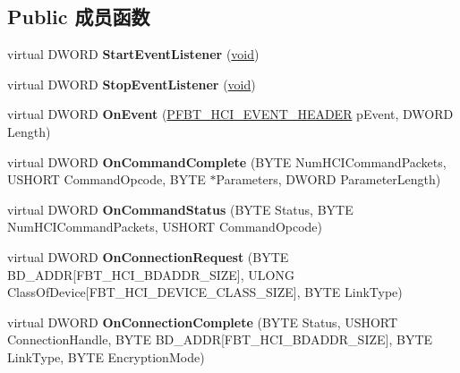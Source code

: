 \subsection*{Public 成员函数}
\begin{DoxyCompactItemize}
\item 
\mbox{\label{class_c_hci_afe226701fc5e2f46b43d4fa34168ecdd}} 
virtual D\+W\+O\+RD {\bfseries Start\+Event\+Listener} (\hyperlink{interfacevoid}{void})
\item 
\mbox{\label{class_c_hci_a0b99c2da2ab8553edd461967981700bb}} 
virtual D\+W\+O\+RD {\bfseries Stop\+Event\+Listener} (\hyperlink{interfacevoid}{void})
\item 
\mbox{\label{class_c_hci_a75c4ca0dd2c7b222f7442509fc59a24c}} 
virtual D\+W\+O\+RD {\bfseries On\+Event} (\hyperlink{struct_f_b_t___h_c_i___e_v_e_n_t___h_e_a_d_e_r}{P\+F\+B\+T\+\_\+\+H\+C\+I\+\_\+\+E\+V\+E\+N\+T\+\_\+\+H\+E\+A\+D\+ER} p\+Event, D\+W\+O\+RD Length)
\item 
\mbox{\label{class_c_hci_aa09bf4fd9dfb3e8ec46a78266e295d37}} 
virtual D\+W\+O\+RD {\bfseries On\+Command\+Complete} (B\+Y\+TE Num\+H\+C\+I\+Command\+Packets, U\+S\+H\+O\+RT Command\+Opcode, B\+Y\+TE $\ast$Parameters, D\+W\+O\+RD Parameter\+Length)
\item 
\mbox{\label{class_c_hci_a4613960747fbb538be3a776213e8fe70}} 
virtual D\+W\+O\+RD {\bfseries On\+Command\+Status} (B\+Y\+TE Status, B\+Y\+TE Num\+H\+C\+I\+Command\+Packets, U\+S\+H\+O\+RT Command\+Opcode)
\item 
\mbox{\label{class_c_hci_af60aa66b4510d8d9acc399848601fb38}} 
virtual D\+W\+O\+RD {\bfseries On\+Connection\+Request} (B\+Y\+TE B\+D\+\_\+\+A\+D\+DR\mbox{[}F\+B\+T\+\_\+\+H\+C\+I\+\_\+\+B\+D\+A\+D\+D\+R\+\_\+\+S\+I\+ZE\mbox{]}, U\+L\+O\+NG Class\+Of\+Device\mbox{[}F\+B\+T\+\_\+\+H\+C\+I\+\_\+\+D\+E\+V\+I\+C\+E\+\_\+\+C\+L\+A\+S\+S\+\_\+\+S\+I\+ZE\mbox{]}, B\+Y\+TE Link\+Type)
\item 
\mbox{\label{class_c_hci_a3260c73f6f766862a29a719677784b43}} 
virtual D\+W\+O\+RD {\bfseries On\+Connection\+Complete} (B\+Y\+TE Status, U\+S\+H\+O\+RT Connection\+Handle, B\+Y\+TE B\+D\+\_\+\+A\+D\+DR\mbox{[}F\+B\+T\+\_\+\+H\+C\+I\+\_\+\+B\+D\+A\+D\+D\+R\+\_\+\+S\+I\+ZE\mbox{]}, B\+Y\+TE Link\+Type, B\+Y\+TE Encryption\+Mode)

\end{DoxyCompactItemize}
